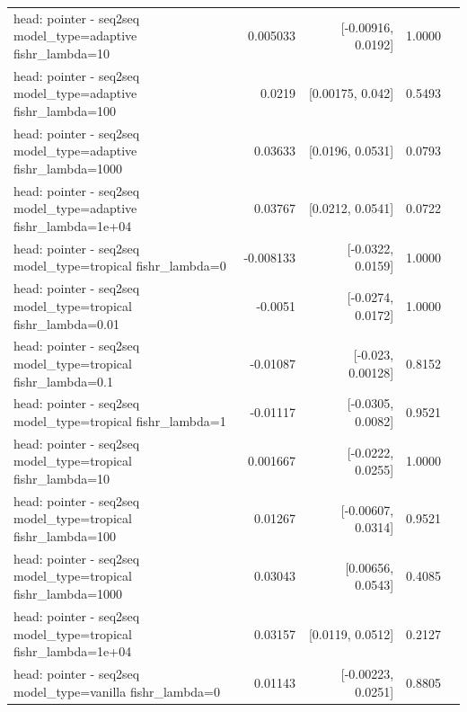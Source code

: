 \documentclass[10pt]{article}
\makeatletter
\newcommand{\stackcell}[1]{\begin{tabular}[t]{@{}l@{}}#1\end{tabular}}
\makeatother
\begin{document}
{\begin{longtable}{lrrrl}
\stackcell{head: pointer - seq2seq\\\footnotesize model\_type=adaptive fishr\_lambda=10 } & 0.005033 & [-0.00916, 0.0192] & 1.0000 & \\
\stackcell{head: pointer - seq2seq\\\footnotesize model\_type=adaptive fishr\_lambda=100 } & 0.0219 & [0.00175, 0.042] & 0.5493 & \\
\stackcell{head: pointer - seq2seq\\\footnotesize model\_type=adaptive fishr\_lambda=1000 } & 0.03633 & [0.0196, 0.0531] & 0.0793 & \\
\stackcell{head: pointer - seq2seq\\\footnotesize model\_type=adaptive fishr\_lambda=1e+04 } & 0.03767 & [0.0212, 0.0541] & 0.0722 & \\
\stackcell{head: pointer - seq2seq\\\footnotesize model\_type=tropical fishr\_lambda=0 } & -0.008133 & [-0.0322, 0.0159] & 1.0000 & \\
\stackcell{head: pointer - seq2seq\\\footnotesize model\_type=tropical fishr\_lambda=0.01 } & -0.0051 & [-0.0274, 0.0172] & 1.0000 & \\
\stackcell{head: pointer - seq2seq\\\footnotesize model\_type=tropical fishr\_lambda=0.1 } & -0.01087 & [-0.023, 0.00128] & 0.8152 & \\
\stackcell{head: pointer - seq2seq\\\footnotesize model\_type=tropical fishr\_lambda=1 } & -0.01117 & [-0.0305, 0.0082] & 0.9521 & \\
\stackcell{head: pointer - seq2seq\\\footnotesize model\_type=tropical fishr\_lambda=10 } & 0.001667 & [-0.0222, 0.0255] & 1.0000 & \\
\stackcell{head: pointer - seq2seq\\\footnotesize model\_type=tropical fishr\_lambda=100 } & 0.01267 & [-0.00607, 0.0314] & 0.9521 & \\
\stackcell{head: pointer - seq2seq\\\footnotesize model\_type=tropical fishr\_lambda=1000 } & 0.03043 & [0.00656, 0.0543] & 0.4085 & \\
\stackcell{head: pointer - seq2seq\\\footnotesize model\_type=tropical fishr\_lambda=1e+04 } & 0.03157 & [0.0119, 0.0512] & 0.2127 & \\
\stackcell{head: pointer - seq2seq\\\footnotesize model\_type=vanilla fishr\_lambda=0 } & 0.01143 & [-0.00223, 0.0251] & 0.8805 & \\

\end{longtable}}
\end{document}
